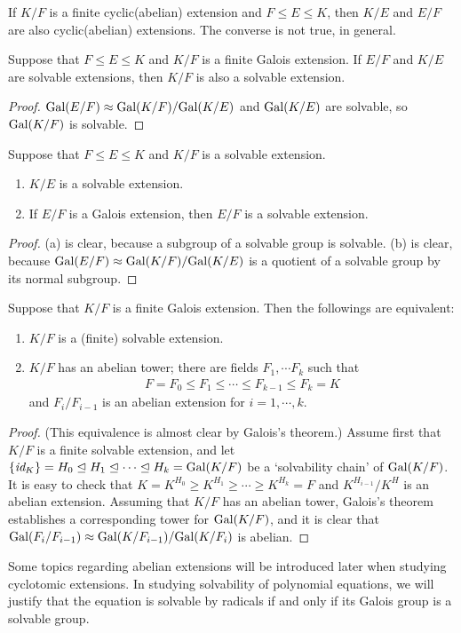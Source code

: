\begin{obs}
    If $K/F$ is a finite cyclic(abelian) extension and $F\leq E\leq K$, then $K/E$ and $E/F$ are also cyclic(abelian) extensions.
    The converse is not true, in general.
\end{obs}
\begin{prop}
    Suppose that $F\leq E\leq K$ and $K/F$ is a finite Galois extension.
    If $E/F$ and $K/E$ are solvable extensions, then $K/F$ is also a solvable extension.
\end{prop}
\begin{proof}
    ${\textrm{Gal}({E/F})}\approx{{\textrm{Gal}({K/F})}}/{{\textrm{Gal}({K/E})}}$ and ${\textrm{Gal}({K/E})}$ are solvable, so ${\textrm{Gal}({K/F})}$ is solvable.
\end{proof}
\begin{prop}
    Suppose that $F\leq E\leq K$ and $K/F$ is a solvable extension.
    \begin{enumerate}
        \item[(a)]
        {
            $K/E$ is a solvable extension.
        }
        \item[(b)]
        {
            If $E/F$ is a Galois extension, then $E/F$ is a solvable extension.
        }
    \end{enumerate}
\end{prop}
\begin{proof}
    (a) is clear, because a subgroup of a solvable group is solvable.
    (b) is clear, because ${\textrm{Gal}({E/F})}\approx{{\textrm{Gal}({K/F})}}/{{\textrm{Gal}({K/E})}}$ is a quotient of a solvable group by its normal subgroup.
\end{proof}
\begin{prop}
    Suppose that $K/F$ is a finite Galois extension.
    Then the followings are equivalent:
    \begin{enumerate}
        \item[(a)]
        {
            $K/F$ is a (finite) solvable extension.
        }
        \item[(b)]
        {
            $K/F$ has an abelian tower; there are fields $F_1, \cdots F_k$ such that
            \begin{align*}
                F=F_0\leq F_1\leq \cdots\leq F_{k-1}\leq F_k=K
            \end{align*}
            and $F_i/F_{i-1}$ is an abelian extension for $i=1, \cdots, k$.
        }
    \end{enumerate}
\end{prop}
\begin{proof}
    (This equivalence is almost clear by Galois's theorem.)
    Assume first that $K/F$ is a finite solvable extension, and let $\{\textit{id}_{K}\}=H_0\trianglelefteq H_1\trianglelefteq \cdots\trianglelefteq H_k={\textrm{Gal}({K/F})}$ be a `solvability chain' of ${\textrm{Gal}({K/F})}$.
    It is easy to check that $K=K^{H_0}\geq K^{H_1}\geq \cdots\geq K^{H_k}=F$ and $K^{H_{i-1}}/K^H$ is an abelian extension.
    Assuming that $K/F$ has an abelian tower, Galois's theorem establishes a corresponding tower for ${\textrm{Gal}({K/F})}$, and it is clear that ${\textrm{Gal}({F_i/F_{i-1}})}\approx{\textrm{Gal}({K/F_{i-1}})}/{\textrm{Gal}({K/F_i})}$ is abelian.
\end{proof}

Some topics regarding abelian extensions will be introduced later when studying cyclotomic extensions.
In studying solvability of polynomial equations, we will justify that the equation is solvable by radicals if and only if its Galois group is a solvable group.